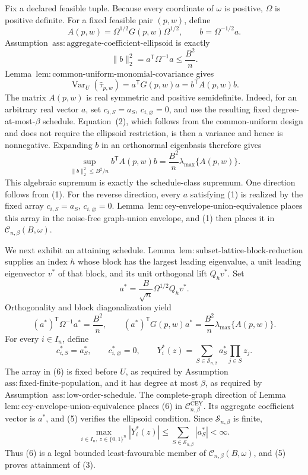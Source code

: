 Fix a declared feasible tuple.  Because every coordinate of \(\omega\) is positive, \(\Omega\) is positive definite.  For a fixed feasible pair \((p,w)\), define
\[
A(p,w)=\Omega^{1/2}G(p,w)\Omega^{1/2},
\qquad b=\Omega^{-1/2}a.
\]
Assumption~\(\mathrm{ass{:}aggregate\text{-}coefficient\text{-}ellipsoid}\) is exactly
\[
\lVert b\rVert_2^2=a^{\mathsf T}\Omega^{-1}a\le \frac{B^2}{n}.
\tag{1}
\]
Lemma~\(\mathrm{lem{:}common\text{-}uniform\text{-}monomial\text{-}covariance}\) gives
\[
\operatorname{Var}_U(\widehat\tau_{p,w})
=a^{\mathsf T}G(p,w)a
=b^{\mathsf T}A(p,w)b.
\tag{2}
\]
The matrix \(A(p,w)\) is real symmetric and positive semidefinite.  Indeed, for an arbitrary real vector \(a\), set \(c_{i,S}=a_S\), \(c_{i,\varnothing}=0\), and use the resulting fixed degree-at-most-\(\beta\) schedule.  Equation~(2), which follows from the common-uniform design and does not require the ellipsoid restriction, is then a variance and hence is nonnegative.  Expanding \(b\) in an orthonormal eigenbasis therefore gives
\[
\sup_{\lVert b\rVert_2^2\le B^2/n}b^{\mathsf T}A(p,w)b
=\frac{B^2}{n}\lambda_{\max}\{A(p,w)\}.
\tag{3}
\]
This algebraic supremum is exactly the schedule-class supremum.  One direction follows from (1).  For the reverse direction, every \(a\) satisfying (1) is realized by the fixed array \(c_{i,S}=a_S\), \(c_{i,\varnothing}=0\).  Lemma~\(\mathrm{lem{:}cey\text{-}envelope\text{-}union\text{-}equivalence}\) places this array in the noise-free graph-union envelope, and (1) then places it in \(\mathcal C_{n,\beta}(B,\omega)\).

We next exhibit an attaining schedule.  Lemma~\(\mathrm{lem{:}subset\text{-}lattice\text{-}block\text{-}reduction}\) supplies an index \(h\) whose block has the largest leading eigenvalue, a unit leading eigenvector \(v^*\) of that block, and its unit orthogonal lift \(Q_hv^*\).  Set
\[
a^*=\frac{B}{\sqrt n}\Omega^{1/2}Q_hv^*.
\tag{4}
\]
Orthogonality and block diagonalization yield
\[
(a^*)^{\mathsf T}\Omega^{-1}a^*=\frac{B^2}{n},
\qquad
(a^*)^{\mathsf T}G(p,w)a^*
=\frac{B^2}{n}\lambda_{\max}\{A(p,w)\}.
\tag{5}
\]
For every \(i\in I_n\), define
\[
c^*_{i,S}=a^*_S,
\qquad c^*_{i,\varnothing}=0,
\qquad
Y_i^*(z)=\sum_{S\in\mathcal S_{n,\beta}}a^*_S\prod_{j\in S}z_j.
\tag{6}
\]
The array in (6) is fixed before \(U\), as required by Assumption~\(\mathrm{ass{:}fixed\text{-}finite\text{-}population}\), and it has degree at most \(\beta\), as required by Assumption~\(\mathrm{ass{:}low\text{-}order\text{-}schedule}\).  The complete-graph direction of Lemma~\(\mathrm{lem{:}cey\text{-}envelope\text{-}union\text{-}equivalence}\) places (6) in \(\mathcal C^{\mathrm{CEY}}_{n,\beta}\).  Its aggregate coefficient vector is \(a^*\), and (5) verifies the ellipsoid condition.  Since \(\mathcal S_{n,\beta}\) is finite,
\[
\max_{i\in I_n,\ z\in\{0,1\}^n}|Y_i^*(z)|
\le \sum_{S\in\mathcal S_{n,\beta}}|a_S^*|<\infty.
\tag{7}
\]
Thus (6) is a legal bounded least-favourable member of \(\mathcal C_{n,\beta}(B,\omega)\), and (5) proves attainment of (3).

